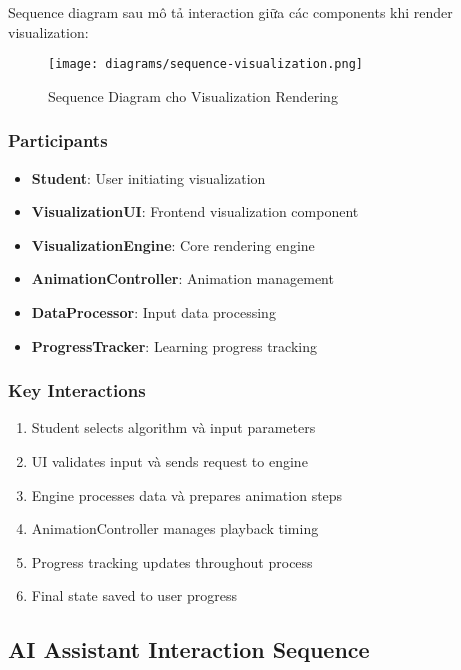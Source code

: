 Sequence diagram sau mô tả interaction giữa các components khi render visualization:

\begin{figure}[H]
\centering
\texttt{[image: diagrams/sequence-visualization.png]}
\caption{Sequence Diagram cho Visualization Rendering}
\label{fig:sequence-viz}
\end{figure}

\subsubsection{Participants}

\begin{itemize}
    \item \textbf{Student}: User initiating visualization
    \item \textbf{VisualizationUI}: Frontend visualization component
    \item \textbf{VisualizationEngine}: Core rendering engine
    \item \textbf{AnimationController}: Animation management
    \item \textbf{DataProcessor}: Input data processing
    \item \textbf{ProgressTracker}: Learning progress tracking
\end{itemize}

\subsubsection{Key Interactions}

\begin{enumerate}
    \item Student selects algorithm và input parameters
    \item UI validates input và sends request to engine
    \item Engine processes data và prepares animation steps
    \item AnimationController manages playback timing
    \item Progress tracking updates throughout process
    \item Final state saved to user progress
\end{enumerate}

\subsection{AI Assistant Interaction Sequence}
\label{subsec:ai-sequence}

